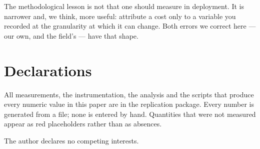 \documentclass[pdflatex,sn-basic,twocolumn]{sn-jnl}
\begin{document}
The methodological lesson is not that one should measure in deployment. It is
narrower and, we think, more useful: attribute a cost only to a variable you
recorded at the granularity at which it can change. Both errors we correct here
--- our own, and the field's --- have that shape.

\section*{Declarations}

 All measurements, the instrumentation, the
analysis and the scripts that produce every numeric value in this paper are in
the replication package. Every number is generated from a file; none is entered
by hand. Quantities that were not measured appear as red placeholders rather than
as absences.

 The author declares no competing interests.


\end{document}
